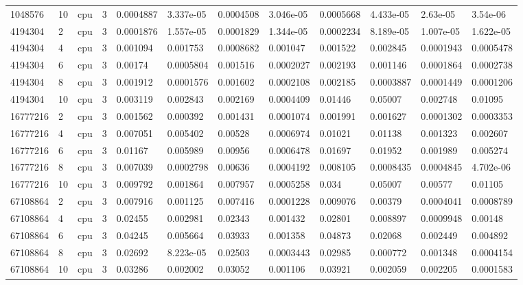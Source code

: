 \begin{tabular}{llllllllllll}
1048576 & 10 & cpu & 3 & 0.0004887 & 3.337e-05 & 0.0004508 & 3.046e-05 & 0.0005668 & 4.433e-05 & 2.63e-05 & 3.54e-06 \\
4194304 & 2 & cpu & 3 & 0.0001876 & 1.557e-05 & 0.0001829 & 1.344e-05 & 0.0002234 & 8.189e-05 & 1.007e-05 & 1.622e-05 \\
4194304 & 4 & cpu & 3 & 0.001094 & 0.001753 & 0.0008682 & 0.001047 & 0.001522 & 0.002845 & 0.0001943 & 0.0005478 \\
4194304 & 6 & cpu & 3 & 0.00174 & 0.0005804 & 0.001516 & 0.0002027 & 0.002193 & 0.001146 & 0.0001864 & 0.0002738 \\
4194304 & 8 & cpu & 3 & 0.001912 & 0.0001576 & 0.001602 & 0.0002108 & 0.002185 & 0.0003887 & 0.0001449 & 0.0001206 \\
4194304 & 10 & cpu & 3 & 0.003119 & 0.002843 & 0.002169 & 0.0004409 & 0.01446 & 0.05007 & 0.002748 & 0.01095 \\
16777216 & 2 & cpu & 3 & 0.001562 & 0.000392 & 0.001431 & 0.0001074 & 0.001991 & 0.001627 & 0.0001302 & 0.0003353 \\
16777216 & 4 & cpu & 3 & 0.007051 & 0.005402 & 0.00528 & 0.0006974 & 0.01021 & 0.01138 & 0.001323 & 0.002607 \\
16777216 & 6 & cpu & 3 & 0.01167 & 0.005989 & 0.00956 & 0.0006478 & 0.01697 & 0.01952 & 0.001989 & 0.005274 \\
16777216 & 8 & cpu & 3 & 0.007039 & 0.0002798 & 0.00636 & 0.0004192 & 0.008105 & 0.0008435 & 0.0004845 & 4.702e-06 \\
16777216 & 10 & cpu & 3 & 0.009792 & 0.001864 & 0.007957 & 0.0005258 & 0.034 & 0.05007 & 0.00577 & 0.01105 \\
67108864 & 2 & cpu & 3 & 0.007916 & 0.001125 & 0.007416 & 0.0001228 & 0.009076 & 0.00379 & 0.0004041 & 0.0008789 \\
67108864 & 4 & cpu & 3 & 0.02455 & 0.002981 & 0.02343 & 0.001432 & 0.02801 & 0.008897 & 0.0009948 & 0.00148 \\
67108864 & 6 & cpu & 3 & 0.04245 & 0.005664 & 0.03933 & 0.001358 & 0.04873 & 0.02068 & 0.002449 & 0.004892 \\
67108864 & 8 & cpu & 3 & 0.02692 & 8.223e-05 & 0.02503 & 0.0003443 & 0.02985 & 0.000772 & 0.001348 & 0.0004154 \\
67108864 & 10 & cpu & 3 & 0.03286 & 0.002002 & 0.03052 & 0.001106 & 0.03921 & 0.002059 & 0.002205 & 0.0001583 \\
\hline
\end{tabular}
